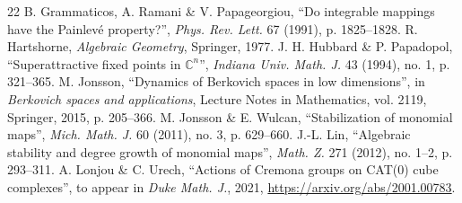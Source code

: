 \documentclass[11pt]{article}
\begin{document}
\begin{thebibliography}{22}
 B. Grammaticos, A. Ramani \& V. Papageorgiou, ``Do integrable
mappings have the Painlevé property?'', \emph{Phys. Rev. Lett.} 67 (1991),
p. 1825--1828.
 R. Hartshorne, \emph{Algebraic Geometry}, Springer, 1977.
 J. H. Hubbard \& P. Papadopol, ``Superattractive fixed points
in $\mathbb C^n$'', \emph{Indiana Univ. Math. J.} 43 (1994), no. 1, p. 321--365.
 M. Jonsson, ``Dynamics of Berkovich spaces in low dimensions'',
in \emph{Berkovich spaces and applications}, Lecture Notes in Mathematics,
vol. 2119, Springer, 2015, p. 205--366.
 M. Jonsson \& E. Wulcan, ``Stabilization of monomial maps'',
\emph{Mich. Math. J.} 60 (2011), no. 3, p. 629--660.
 J.-L. Lin, ``Algebraic stability and degree growth of monomial
maps'', \emph{Math. Z.} 271 (2012), no. 1--2, p. 293--311.
 A. Lonjou \& C. Urech, ``Actions of Cremona groups on CAT(0)
cube complexes'', to appear in \emph{Duke Math. J.}, 2021,
\url{https://arxiv.org/abs/2001.00783}.
\end{thebibliography}
\end{document}
